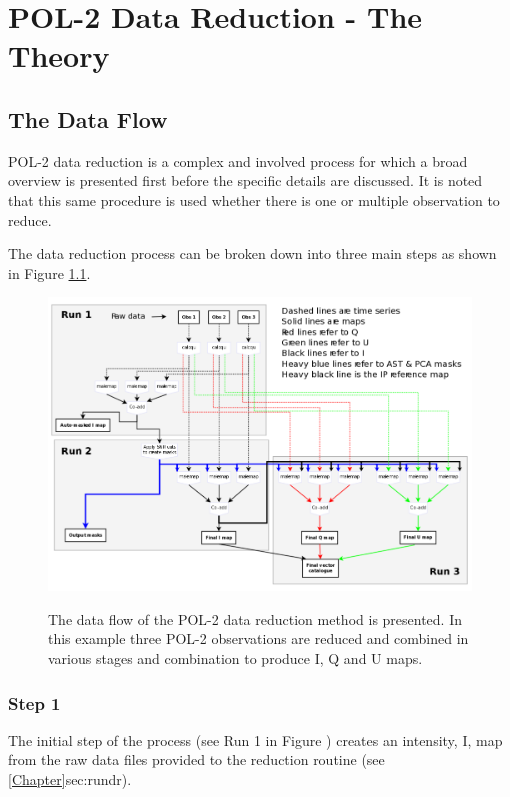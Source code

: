 \chapter{POL-2 Data Reduction - The Theory}
\label{sec:dr}
\section{The Data Flow}

POL-2 data reduction is a complex and involved process for which a broad overview is presented first before
the specific details are discussed. It is noted that this same procedure is used whether there is one or 
multiple observation to reduce.

The data reduction process can be broken down into three main steps as shown in Figure \ref{fig:pol2drflow}.

\begin{figure}[t!]
\begin{center}
\includegraphics[width=0.95\linewidth]{pol2-dr-flow.png}
\label{fig:pol2drflow}
\caption [POL-2 Data Flow]{
  \small The data flow of the POL-2 data reduction method is
  presented. In this example three POL-2 observations are
  reduced and combined in various stages and combination to
  produce I, Q and U maps.
}
\end{center}
\end{figure}


\subsection*{Step 1}

The initial step of the process (see Run 1 in Figure \cite{fig:pol2drflow}) creates 
an intensity, I, map from the raw data files provided to the reduction routine (see \cref{Chapter}{sec:rundr}). 


